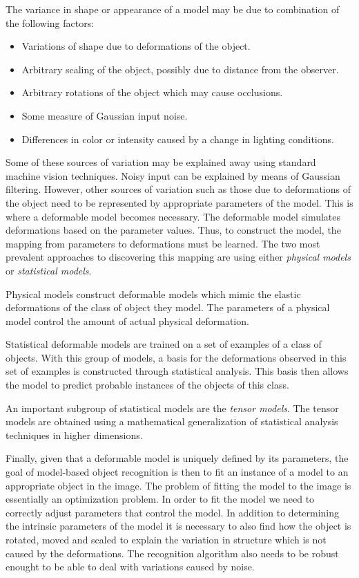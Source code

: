 \documentclass[11pt,a4paper]{report}
\begin{document}
The variance in shape or appearance of a model may be due to combination of the following
factors:
\begin{itemize}
\item Variations of shape due to deformations of the object.
\item Arbitrary scaling of the object, possibly due to distance from the observer.
\item Arbitrary rotations of the object which may cause occlusions. 
\item Some measure of Gaussian input noise.
\item Differences in color or intensity caused by a change in lighting conditions.
\end{itemize}
Some of these sources of variation may be explained away using standard machine
vision techniques. Noisy input can be explained by means of Gaussian
filtering. However, other sources of variation such as those due to deformations of the
object need to be represented by appropriate parameters of the model. This is
where a deformable model becomes necessary. The
deformable model simulates deformations based on the parameter values. Thus, to
construct the model, the mapping from parameters to deformations must be learned. The two
most prevalent approaches to discovering this mapping are using either \textit{physical
models} or \textit{statistical models}.

Physical models construct deformable models which mimic the elastic deformations
of the class of object they model. The parameters of a physical model control the amount
of actual physical deformation.

Statistical deformable models are trained on a set of examples of a class of
objects. With this group of models, a basis for the deformations observed in
this set of examples is constructed through statistical analysis. This basis then allows the model to predict
probable instances of the objects of this class. 

An important subgroup of statistical models are the \textit{tensor models}. The
tensor models are obtained using a mathematical generalization of statistical analysis
techniques in higher dimensions.

Finally, given that a deformable model is uniquely defined by its parameters,
 the goal of model-based object recognition is then to fit an instance of a model to
an appropriate object in the image. The problem of fitting the model to the
image is essentially an optimization problem. In order to fit the model we need to
correctly adjust parameters that control the model. In addition to determining
the intrinsic parameters of the model it is necessary to also find how the
object is rotated, moved and scaled to explain the variation in structure which
is not caused by the deformations. The recognition algorithm also needs to be
robust enought to be able to deal with variations caused by noise.
\end{document}
